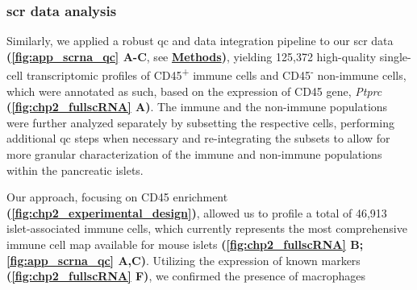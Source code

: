 \subsubsection{\large \gls{scr} data analysis}
\label{sec_chp2_scrna1}
Similarly, we applied a robust \gls{qc} and data integration pipeline to our \gls{scr} data \textbf{(\autoref{fig:app_scrna_qc} A-C}, see \hyperref[sec:chp2_methods]{\textbf{Methods}}\textbf{)}, yielding 125,372 high-quality single-cell transcriptomic profiles of CD45\textsuperscript{+} immune cells and CD45\textsuperscript{-} non-immune cells, which were annotated as such, based on the expression of CD45 gene, \textit{Ptprc} \textbf{(\autoref{fig:chp2_fullscRNA} A)}. The immune and the non-immune populations were further analyzed separately by subsetting the respective cells, performing additional \gls{qc} steps when necessary and re-integrating the subsets to allow for more granular characterization of the immune and non-immune populations within the pancreatic islets.\\
\par Our approach, focusing on CD45 enrichment \textbf{(\autoref{fig:chp2_experimental_design})}, allowed us to profile a total of 46,913 islet-associated immune cells, which currently represents the most comprehensive immune cell map available for mouse islets \textbf{(\autoref{fig:chp2_fullscRNA} B; \autoref{fig:app_scrna_qc} A,C)}. Utilizing the expression of known markers \textbf{(\autoref{fig:chp2_fullscRNA} F)}, we confirmed the presence of macrophages 


